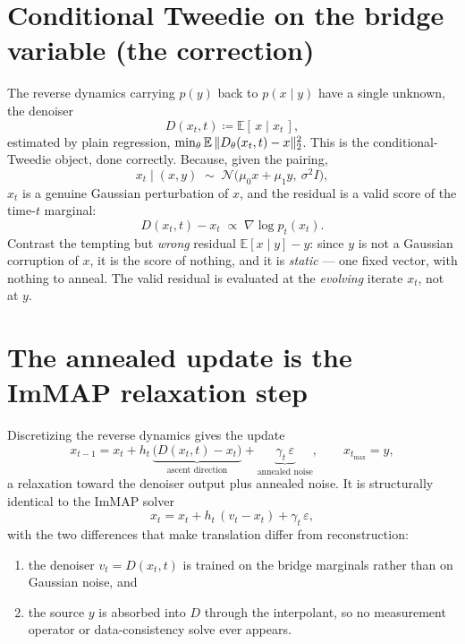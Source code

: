 \documentclass[11pt]{article}
\DeclarePairedDelimiter{\norm}{\lVert}{\rVert}
\newcommand{\E}{\mathbb{E}}
\newcommand{\N}{\mathcal{N}}
\newcommand{\eps}{\varepsilon}
\begin{document}
\section{Conditional Tweedie on the bridge variable (the correction)}
The reverse dynamics carrying $p(y)$ back to $p(x\mid y)$ have a single unknown, the denoiser
\begin{equation}
  D(x_t, t) \coloneqq \E[\,x \mid x_t\,],
\end{equation}
estimated by plain regression, $\min_\theta \E\,\norm{D_\theta(x_t,t) - x}_2^2$. This is the
conditional-Tweedie object, done correctly. Because, given the pairing,
\begin{equation}
  x_t \mid (x,y) \;\sim\; \N\!\big(\mu_0 x + \mu_1 y,\ \sigma^2 I\big),
\end{equation}
$x_t$ is a genuine Gaussian perturbation of $x$, and the residual is a valid score of the
time-$t$ marginal:
\begin{equation}
  D(x_t,t) - x_t \;\propto\; \nabla \log p_t(x_t).
\end{equation}
Contrast the tempting but \emph{wrong} residual $\E[x\mid y] - y$: since $y$ is not a
Gaussian corruption of $x$, it is the score of nothing, and it is \emph{static} --- one
fixed vector, with nothing to anneal. The valid residual is evaluated at the \emph{evolving}
iterate $x_t$, not at $y$.

\section{The annealed update is the ImMAP relaxation step}
Discretizing the reverse dynamics gives the update
\begin{equation}
  x_{t-1} = x_t + h_t\,\underbrace{\big(D(x_t,t) - x_t\big)}_{\text{ascent direction}}
            + \underbrace{\gamma_t\,\eps}_{\text{annealed noise}},
  \qquad x_{t_{\max}} = y,
\end{equation}
a relaxation toward the denoiser output plus annealed noise. It is structurally identical to
the ImMAP solver
\begin{equation}
  x_t = x_t + h_t\,(v_t - x_t) + \gamma_t\,\eps,
\end{equation}
with the two differences that make translation differ from reconstruction:
\begin{enumerate}[label=(\roman*), nosep]
  \item the denoiser $v_t = D(x_t,t)$ is trained on the bridge marginals rather than on
        Gaussian noise, and
  \item the source $y$ is absorbed into $D$ through the interpolant, so no measurement
        operator or data-consistency solve ever appears.
\end{enumerate}
\end{document}
